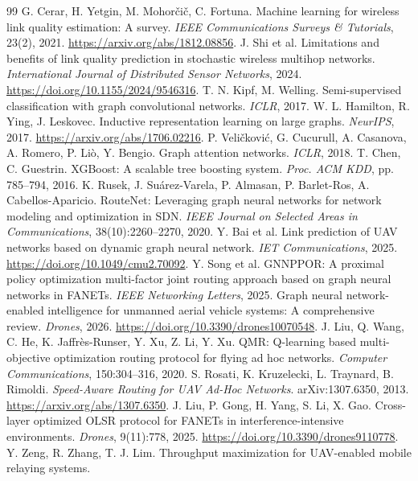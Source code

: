 \documentclass[11pt,a4paper]{article}
\begin{document}
\begin{thebibliography}{99}
 G. Cerar, H. Yetgin, M. Mohorčič, C. Fortuna.
Machine learning for wireless link quality estimation: A survey.
\textit{IEEE Communications Surveys \& Tutorials}, 23(2), 2021.
\url{https://arxiv.org/abs/1812.08856}.
 J. Shi et al.
Limitations and benefits of link quality prediction in stochastic wireless
multihop networks. \textit{International Journal of Distributed Sensor
Networks}, 2024. \url{https://doi.org/10.1155/2024/9546316}.
 T. N. Kipf, M. Welling.
Semi-supervised classification with graph convolutional networks.
\textit{ICLR}, 2017.
 W. L. Hamilton, R. Ying, J. Leskovec.
Inductive representation learning on large graphs.
\textit{NeurIPS}, 2017. \url{https://arxiv.org/abs/1706.02216}.
 P. Veličković, G. Cucurull, A. Casanova, A. Romero, P. Liò,
Y. Bengio. Graph attention networks. \textit{ICLR}, 2018.
 T. Chen, C. Guestrin.
XGBoost: A scalable tree boosting system.
\textit{Proc. ACM KDD}, pp. 785--794, 2016.
 K. Rusek, J. Suárez-Varela, P. Almasan, P. Barlet-Ros,
A. Cabellos-Aparicio. RouteNet: Leveraging graph neural networks for network
modeling and optimization in SDN.
\textit{IEEE Journal on Selected Areas in Communications}, 38(10):2260--2270, 2020.
 Y. Bai et al.
Link prediction of UAV networks based on dynamic graph neural network.
\textit{IET Communications}, 2025. \url{https://doi.org/10.1049/cmu2.70092}.
 Y. Song et al.
GNNPPOR: A proximal policy optimization multi-factor joint routing approach
based on graph neural networks in FANETs.
\textit{IEEE Networking Letters}, 2025.
 Graph neural network-enabled intelligence for unmanned
aerial vehicle systems: A comprehensive review.
\textit{Drones}, 2026. \url{https://doi.org/10.3390/drones10070548}.
 J. Liu, Q. Wang, C. He, K. Jaffrès-Runser, Y. Xu, Z. Li, Y. Xu.
QMR: Q-learning based multi-objective optimization routing protocol for flying
ad hoc networks. \textit{Computer Communications}, 150:304--316, 2020.
 S. Rosati, K. Kruzelecki, L. Traynard, B. Rimoldi.
\textit{Speed-Aware Routing for UAV Ad-Hoc Networks}.
arXiv:1307.6350, 2013. \url{https://arxiv.org/abs/1307.6350}.
 J. Liu, P. Gong, H. Yang, S. Li, X. Gao.
Cross-layer optimized OLSR protocol for FANETs in interference-intensive
environments. \textit{Drones}, 9(11):778, 2025.
\url{https://doi.org/10.3390/drones9110778}.
 Y. Zeng, R. Zhang, T. J. Lim.
Throughput maximization for UAV-enabled mobile relaying systems.

\end{thebibliography}
\end{document}

